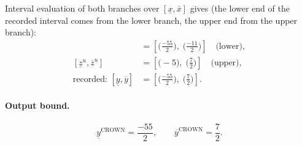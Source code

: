\documentclass[11pt]{article}
\begin{document}
Interval evaluation of both branches over $[\underline{x}, \overline{x}]$ gives (the lower end of the recorded interval comes from the lower branch, the upper end from the upper branch):
\begin{align*}
[\underline{z}^{\ell}, \overline{z}^{\ell}] &= [\bigl(\frac{-55}{2}\bigr),\; \bigl(\frac{-11}{2}\bigr)] \quad\text{(lower)}, \\
[\underline{z}^{u}, \overline{z}^{u}] &= [\bigl(-5\bigr),\; \bigl(\frac{7}{2}\bigr)] \quad\text{(upper)}, \\
\text{recorded: } [\underline{y}, \overline{y}] &= [\bigl(\frac{-55}{2}\bigr),\; \bigl(\frac{7}{2}\bigr)].
\end{align*}
\paragraph{Output bound.}
\begin{equation*}
\underline{y}^{\text{CROWN}} = \frac{-55}{2}, \qquad \overline{y}^{\text{CROWN}} = \frac{7}{2}.
\end{equation*}
\end{document}
